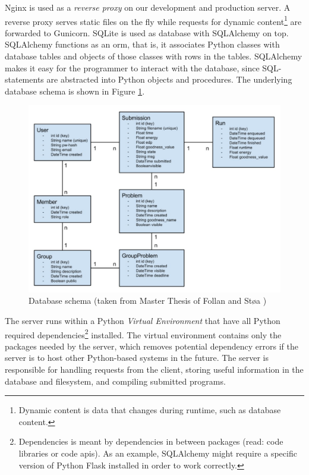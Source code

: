 Nginx \cite{NGINX} is used as a \textit{reverse proxy} on our development and production server. A reverse proxy serves static files on the fly while requests for dynamic content\footnote{Dynamic content is data that changes during runtime, such as database content.} are forwarded to Gunicorn. SQLite \cite{SQLITE} is used as database with SQLAlchemy \cite{SQLALCHEMY} on top. SQLAlchemy functions as an \gls{orm}, that is, it associates Python classes with database tables and objects of those classes with rows in the tables. SQLAlchemy makes it easy for the programmer to interact with the database, since SQL-statements are abstracted into Python objects and procedures. The underlying database schema is shown in Figure \ref{fig:old-database-schema}.\\

\begin{figure}
  \centering
  \includegraphics[width=1.0\textwidth]{figs/old_database_schema.jpg}
  \caption[Database schema]{Database schema (taken from Master Thesis of Follan and Støa \cite{mt:T&S})}
  \label{fig:old-database-schema}
\end{figure}

The server runs within a Python \textit{Virtual Environment} \cite{VIRTUALENV} that have all Python required dependencies\footnote{Dependencies is meant by dependencies in between packages (read: code libraries or code \gls{api}s). As an example, SQLAlchemy might require a specific version of Python Flask installed in order to work correctly.} installed. The virtual environment contains only the packages needed by the server, which removes potential dependency errors if the server is to host other Python-based systems in the future. The server is responsible for handling requests from the client, storing useful information in the database and filesystem, and compiling submitted programs. \\

